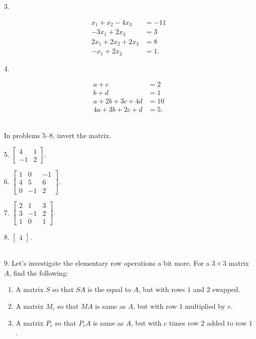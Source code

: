 \documentclass{article}
\begin{document}
3.

\begin{align*}
	x_1 + x_2 - 4x_3 &= -11\\
	-3x_1 + 2x_3 &= 3\\
	2x_1 + 2x_2 + 2x_3 &= 8\\
	-x_1 + 2x_2 &= 1.
\end{align*}

4.

\begin{align*}
	a + c &= 2\\
	b + d &= 1\\
	a + 2b + 3c + 4d &= 10\\
	4a + 3b + 2c + d &= 5.
\end{align*}

~\\

In problems 5--8, invert the matrix.

5. $\displaystyle \left[\begin{array}{cc}4& 1 \\ -1& 2\end{array}\right].$

6. $\displaystyle \left[\begin{array}{ccc}1& 0& -1 \\ 4& 5& 6 \\ 0& -1& 2\end{array}\right].$

7. $\displaystyle \left[\begin{array}{ccc}2& 1& 3 \\ 3& -1& 2 \\ 1& 0& 1\end{array}\right].$

8. $\displaystyle \left[\begin{array}{c}4\end{array}\right].$

~\\

9. Let's investigate the elementary row operations a bit more. For a $3 \times 3$ matrix $A$, find the following:

\begin{enumerate}

	\item A matrix $S$ so that $SA$ is the equal to $A$, but with rows $1$ and $2$ swapped.

	\item A matrix $M_c$ so that $MA$ is same as $A$, but with row $1$ multiplied by $c$.

	\item A matrix $P_c$ so that $P_cA$ is same as $A$, but with $c$ times row $2$ added to row $1$.

\end{enumerate}
\end{document}
